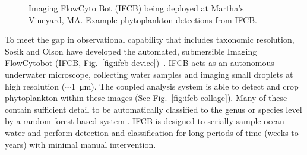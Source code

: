 \begin{figure}
\begin{center}

%
\end{center}
\caption{
\protect{} Imaging FlowCyto Bot (IFCB) being deployed at Martha's Vineyard, MA.
\protect{} Example phytoplankton detections from IFCB.
}
\label{fig:ifcb}
\end{figure}

To meet the gap in observational capability that includes taxonomic resolution, Sosik and Olson have developed the automated, submersible Imaging FlowCytobot (IFCB, Fig.~\ref{fig:ifcb-device})~\citep{Olson2007a}. IFCB acts as an autonomous underwater microscope, collecting water samples and imaging small droplets at high resolution ($\sim$\SI{1}{\micro\meter}). The coupled analysis system \citep{Sosik2007} is able to detect and crop phytoplankton within these images (See Fig.~\ref{fig:ifcb-collage}). Many of these contain sufficient detail to be automatically classified to the genus or species level by a random-forest based system \citep{Sosik2016}. IFCB is designed to serially sample ocean water and perform detection and classification for long periods of time (weeks to years) with minimal manual intervention.

